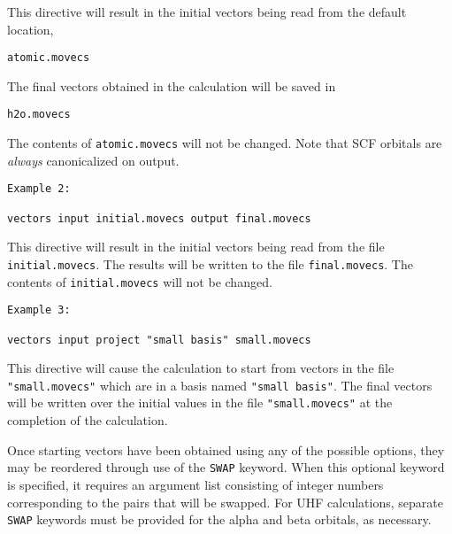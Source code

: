 This directive will result in the initial vectors being read from the 
default location,

\verb+atomic.movecs+

The final vectors 
obtained in the calculation
will be saved in 

\verb+h2o.movecs+

The contents of \verb+atomic.movecs+
will not be changed.  Note that SCF orbitals are {\em always}
canonicalized on output.



\begin{verbatim}
Example 2:

vectors input initial.movecs output final.movecs
\end{verbatim}

This directive will result in the initial vectors being read from the file
\verb+initial.movecs+.  The results will be written to the file
\verb+final.movecs+.  The contents of \verb+initial.movecs+ will not be
changed.

\begin{verbatim}
Example 3:

vectors input project "small basis" small.movecs
\end{verbatim}

This directive will cause the calculation to start from vectors in the
file \verb+"small.movecs"+ which are in a basis named \verb+"small basis"+.
The final vectors will be written over the initial values in the file
\verb+"small.movecs"+ at the completion of the calculation.
 

Once starting vectors have been obtained using any of the possible
options, they may be reordered through use of the \verb+SWAP+ keyword.
When this optional keyword is specified, it requires an
argument list consisting of integer numbers corresponding to the pairs 
that will be swapped.
For UHF calculations, separate \verb+SWAP+ keywords must be provided
for the alpha and beta orbitals, as necessary.

